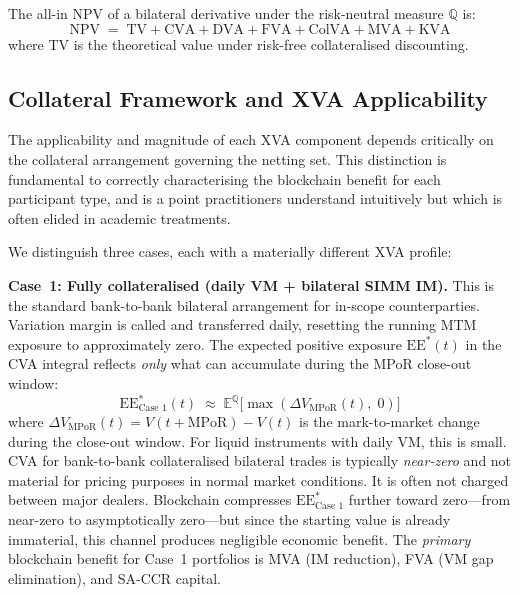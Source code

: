 \documentclass[12pt,letterpaper]{article}
\numberwithin{equation}{section}
\theoremstyle{remark}
\newcommand{\EQ}{\mathbb{E}^{\mathbb{Q}}}          %
\newcommand{\MPoR}{\mathrm{MPoR}}
\newcommand{\EE}{\mathrm{EE}}
\begin{document}
The all-in NPV of a bilateral derivative under the risk-neutral measure
$\mathbb{Q}$ is:
\begin{equation}
  \mathrm{NPV} \;=\; \mathrm{TV} + \mathrm{CVA} + \mathrm{DVA}
  + \mathrm{FVA} + \mathrm{ColVA} + \mathrm{MVA} + \mathrm{KVA}
  \label{eq:npv}
\end{equation}
where TV is the theoretical value under risk-free collateralised discounting.

\subsection{Collateral Framework and XVA Applicability}
\label{subsec:framework}

The applicability and magnitude of each XVA component depends critically on
the collateral arrangement governing the netting set. This distinction is
fundamental to correctly characterising the blockchain benefit for each
participant type, and is a point practitioners understand intuitively but
which is often elided in academic treatments.

We distinguish three cases, each with a materially different XVA profile:

\textbf{Case~1: Fully collateralised (daily VM + bilateral SIMM IM).}
This is the standard bank-to-bank bilateral arrangement for in-scope
counterparties. Variation margin is called and transferred daily, resetting
the running MTM exposure to approximately zero. The expected positive
exposure $\EE^*(t)$ in the CVA integral reflects \emph{only} what can
accumulate during the MPoR close-out window:
\begin{equation}
  \EE^*_{\text{Case 1}}(t) \;\approx\;
  \EQ\!\bigl[\max(\Delta V_{\MPoR}(t),\; 0)\bigr]
  \label{eq:ee_case1}
\end{equation}
where $\Delta V_{\MPoR}(t) = V(t + \MPoR) - V(t)$ is the mark-to-market
change during the close-out window. For liquid instruments with daily VM,
this is small. CVA for bank-to-bank collateralised bilateral trades is
typically \emph{near-zero} and not material for pricing purposes in normal
market conditions. It is often not charged between major dealers.
Blockchain compresses $\EE^*_{\text{Case 1}}$ further toward zero---from
near-zero to asymptotically zero---but since the starting value is already
immaterial, this channel produces negligible economic benefit. The
\emph{primary} blockchain benefit for Case~1 portfolios is MVA (IM
reduction), FVA (VM gap elimination), and SA-CCR capital.
\end{document}
